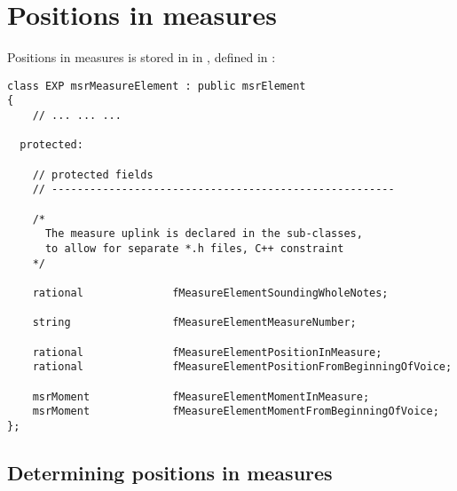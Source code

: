 

\chapter{Positions in measures}

Positions in measures is stored in  in , defined in :
\begin{lstlisting}[language=CPlusPlus]
class EXP msrMeasureElement : public msrElement
{
	// ... ... ...

  protected:

    // protected fields
    // ------------------------------------------------------

    /*
      The measure uplink is declared in the sub-classes,
      to allow for separate *.h files, C++ constraint
    */

    rational              fMeasureElementSoundingWholeNotes;

    string                fMeasureElementMeasureNumber;

    rational              fMeasureElementPositionInMeasure;
    rational              fMeasureElementPositionFromBeginningOfVoice;

    msrMoment             fMeasureElementMomentInMeasure;
    msrMoment             fMeasureElementMomentFromBeginningOfVoice;
};
\end{lstlisting}

\section{Determining positions in measures}

